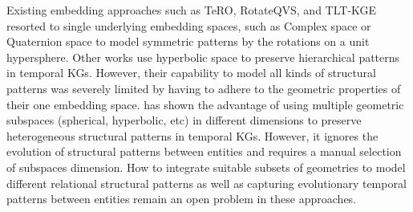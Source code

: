 \documentclass[letterpaper]{article} %
\begin{document}
Existing embedding approaches such as TeRO, RotateQVS, and TLT-KGE\cite{xu2020tero,chen2022rotateqvs,tltcomplexzhang2022along} resorted to single underlying embedding spaces, such as Complex space or Quaternion space to model symmetric patterns by the rotations on a unit hypersphere. Other works \cite{chami2020low,balazevic2019multi,herculemontella2021hyperbolic,han2020dyernie} use hyperbolic space to preserve hierarchical patterns in temporal KGs. However, their capability to model all kinds of structural patterns was severely limited by having to adhere to the geometric properties of their one embedding space.
\cite{han2020dyernie} has shown the advantage of using multiple geometric subspaces (spherical, hyperbolic, etc) in different dimensions to preserve heterogeneous structural patterns in temporal KGs. However, it ignores the evolution of structural patterns between entities and requires a manual selection of subspaces dimension. How to integrate suitable subsets of geometries to model different relational structural patterns as well as capturing evolutionary temporal patterns between entities remain an open problem in these approaches.

\end{document}
